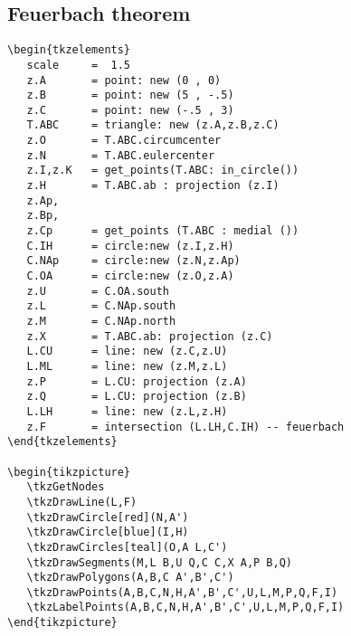 \subsection{Feuerbach theorem} %
\label{sub:nine_points}
\begin{minipage}[t]{.5\textwidth}\vspace{0pt}%
\begin{verbatim}
\begin{tkzelements}
   scale     =  1.5
   z.A       = point: new (0 , 0)
   z.B       = point: new (5 , -.5)
   z.C       = point: new (-.5 , 3)
   T.ABC     = triangle: new (z.A,z.B,z.C)
   z.O       = T.ABC.circumcenter
   z.N       = T.ABC.eulercenter
   z.I,z.K   = get_points(T.ABC: in_circle())
   z.H       = T.ABC.ab : projection (z.I)
   z.Ap,
   z.Bp,
   z.Cp      = get_points (T.ABC : medial ())
   C.IH      = circle:new (z.I,z.H)
   C.NAp     = circle:new (z.N,z.Ap)
   C.OA      = circle:new (z.O,z.A)
   z.U       = C.OA.south
   z.L       = C.NAp.south
   z.M       = C.NAp.north
   z.X       = T.ABC.ab: projection (z.C)
   L.CU      = line: new (z.C,z.U)
   L.ML      = line: new (z.M,z.L)
   z.P       = L.CU: projection (z.A)
   z.Q       = L.CU: projection (z.B)
   L.LH      = line: new (z.L,z.H)
   z.F       = intersection (L.LH,C.IH) -- feuerbach
\end{tkzelements}

\begin{tikzpicture}
   \tkzGetNodes
   \tkzDrawLine(L,F)
   \tkzDrawCircle[red](N,A')
   \tkzDrawCircle[blue](I,H)
   \tkzDrawCircles[teal](O,A L,C')
   \tkzDrawSegments(M,L B,U Q,C C,X A,P B,Q)
   \tkzDrawPolygons(A,B,C A',B',C')
   \tkzDrawPoints(A,B,C,N,H,A',B',C',U,L,M,P,Q,F,I)
   \tkzLabelPoints(A,B,C,N,H,A',B',C',U,L,M,P,Q,F,I)
\end{tikzpicture}
\end{verbatim}
\end{minipage}
